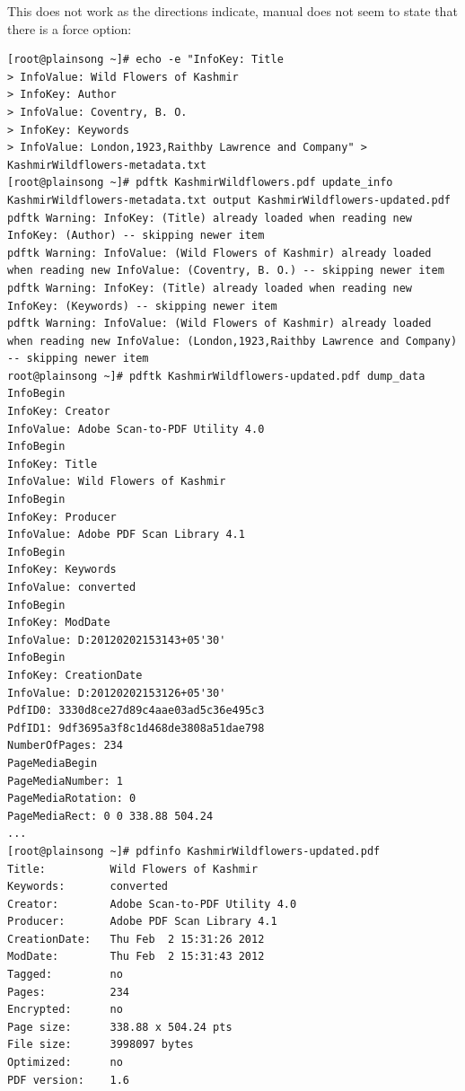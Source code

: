 \documentclass[10pt]{article}
\begin{document}
This does not work as the directions indicate, manual does not seem to state that there is a force option:
\begin{Verbatim}[fontsize=\scriptsize]
[root@plainsong ~]# echo -e "InfoKey: Title
> InfoValue: Wild Flowers of Kashmir
> InfoKey: Author
> InfoValue: Coventry, B. O.
> InfoKey: Keywords
> InfoValue: London,1923,Raithby Lawrence and Company" > KashmirWildflowers-metadata.txt
[root@plainsong ~]# pdftk KashmirWildflowers.pdf update_info KashmirWildflowers-metadata.txt output KashmirWildflowers-updated.pdf
pdftk Warning: InfoKey: (Title) already loaded when reading new InfoKey: (Author) -- skipping newer item
pdftk Warning: InfoValue: (Wild Flowers of Kashmir) already loaded when reading new InfoValue: (Coventry, B. O.) -- skipping newer item
pdftk Warning: InfoKey: (Title) already loaded when reading new InfoKey: (Keywords) -- skipping newer item
pdftk Warning: InfoValue: (Wild Flowers of Kashmir) already loaded when reading new InfoValue: (London,1923,Raithby Lawrence and Company) -- skipping newer item
root@plainsong ~]# pdftk KashmirWildflowers-updated.pdf dump_data
InfoBegin
InfoKey: Creator
InfoValue: Adobe Scan-to-PDF Utility 4.0
InfoBegin
InfoKey: Title
InfoValue: Wild Flowers of Kashmir
InfoBegin
InfoKey: Producer
InfoValue: Adobe PDF Scan Library 4.1
InfoBegin
InfoKey: Keywords
InfoValue: converted
InfoBegin
InfoKey: ModDate
InfoValue: D:20120202153143+05'30'
InfoBegin
InfoKey: CreationDate
InfoValue: D:20120202153126+05'30'
PdfID0: 3330d8ce27d89c4aae03ad5c36e495c3
PdfID1: 9df3695a3f8c1d468de3808a51dae798
NumberOfPages: 234
PageMediaBegin
PageMediaNumber: 1
PageMediaRotation: 0
PageMediaRect: 0 0 338.88 504.24
...
[root@plainsong ~]# pdfinfo KashmirWildflowers-updated.pdf
Title:          Wild Flowers of Kashmir
Keywords:       converted
Creator:        Adobe Scan-to-PDF Utility 4.0
Producer:       Adobe PDF Scan Library 4.1
CreationDate:   Thu Feb  2 15:31:26 2012
ModDate:        Thu Feb  2 15:31:43 2012
Tagged:         no
Pages:          234
Encrypted:      no
Page size:      338.88 x 504.24 pts
File size:      3998097 bytes
Optimized:      no
PDF version:    1.6
\end{Verbatim}
\end{document}
